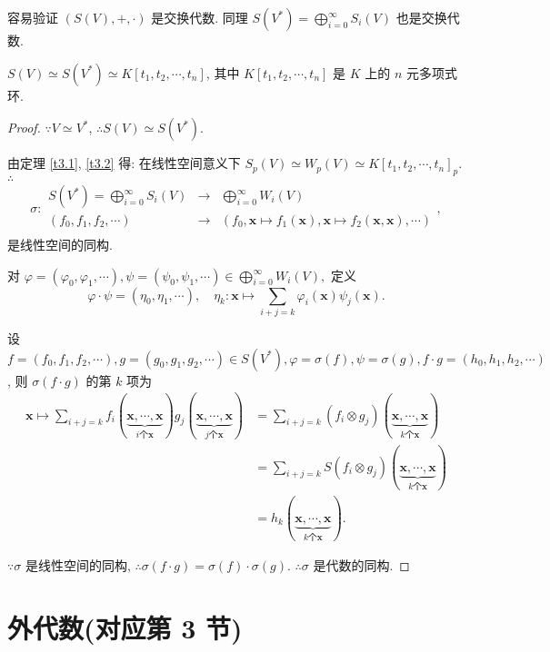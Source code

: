 \documentclass[color=black,device=normal,lang=cn,mode=geye]{elegantnote}
\begin{document}
容易验证 $(S(V),+,\cdot)$ 是交换代数. 同理 $S(V^*)=\bigoplus\limits_{i=0}^\infty S_i(V)$ 也是交换代数.
\begin{theorem}
    $S(V)\simeq S(V^*)\simeq K[t_1,t_2,\cdots,t_n]$, 其中 $K[t_1,t_2,\cdots,t_n]$ 是 $K$ 上的 $n$ 元多项式环.
\end{theorem}
\begin{proof}
    $\because V\simeq V^*$, $\therefore S(V)\simeq S(V^*)$.

    由定理 \ref{t3.1}, \ref{t3.2} 得: 在线性空间意义下 $S_p(V)\simeq W_p(V)\simeq K[t_1,t_2,\cdots,t_n]_p$. $\therefore$
    \[\sigma:\begin{array}{rcl}
        S(V^*)=\bigoplus\limits_{i=0}^\infty S_i(V) & \rightarrow & \bigoplus\limits_{i=0}^\infty W_i(V) \\
        (f_0,f_1,f_2,\cdots) & \rightarrow & (f_0,\boldsymbol{x}\mapsto f_1(\boldsymbol{x}),\boldsymbol{x}\mapsto f_2(\boldsymbol{x},\boldsymbol{x}),\cdots) \\
    \end{array},\]
    是线性空间的同构.

    对 $\varphi=(\varphi_0,\varphi_1,\cdots),\psi=(\psi_0,\psi_1,\cdots)\in\bigoplus\limits_{i=0}^\infty W_i(V),$ 定义
    \[\varphi\cdot\psi=(\eta_0,\eta_1,\cdots),\quad\eta_k:\boldsymbol{x}\mapsto\sum\limits_{i+j=k}\varphi_i(\boldsymbol{x})\psi_j(\boldsymbol{x}).\]

    设 $f=(f_0,f_1,f_2,\cdots),g=(g_0,g_1,g_2,\cdots)\in S(V^*),\varphi=\sigma(f),\psi=\sigma(g),f\cdot g=(h_0,h_1,h_2,\cdots)$, 则 $\sigma(f\cdot g)$ 的第 $k$ 项为
    \begin{align*}
        \boldsymbol{x}\mapsto\sum\limits_{i+j=k}f_i(\underbrace{\boldsymbol{x},\cdots,\boldsymbol{x}}_{i\text{个}\boldsymbol{x}})g_j(\underbrace{\boldsymbol{x},\cdots,\boldsymbol{x}}_{j\text{个}\boldsymbol{x}}) & =\sum\limits_{i+j=k}(f_i\otimes g_j)(\underbrace{\boldsymbol{x},\cdots,\boldsymbol{x}}_{k\text{个}\boldsymbol{x}}) \\
        & =\sum\limits_{i+j=k}S(f_i\otimes g_j)(\underbrace{\boldsymbol{x},\cdots,\boldsymbol{x}}_{k\text{个}\boldsymbol{x}}) \\
        & =h_k(\underbrace{\boldsymbol{x},\cdots,\boldsymbol{x}}_{k\text{个}\boldsymbol{x}}).
    \end{align*}

    $\because\sigma$ 是线性空间的同构, $\therefore\sigma(f\cdot g)=\sigma(f)\cdot\sigma(g)$. $\therefore\sigma$ 是代数的同构.
\end{proof}
\section{外代数(对应第 3 节)}
\end{document}
